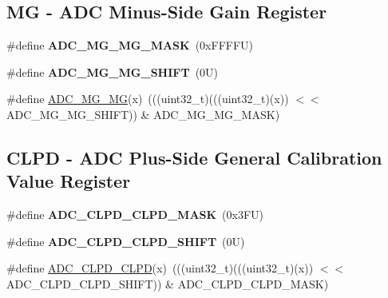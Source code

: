 \subsection*{MG -\/ A\+DC Minus-\/\+Side Gain Register}
\begin{DoxyCompactItemize}
\item 
\mbox{\label{group___a_d_c___register___masks_ga9f415258af1bad0159dd605efccd043b}} 
\#define {\bfseries A\+D\+C\+\_\+\+M\+G\+\_\+\+M\+G\+\_\+\+M\+A\+SK}~(0x\+F\+F\+F\+F\+U)
\item 
\mbox{\label{group___a_d_c___register___masks_ga4b2717da089f0de5bd41ef91001b7cfe}} 
\#define {\bfseries A\+D\+C\+\_\+\+M\+G\+\_\+\+M\+G\+\_\+\+S\+H\+I\+FT}~(0\+U)
\item 
\#define \mbox{\hyperlink{group___a_d_c___register___masks_gaca09277ff124324eca091b84eb116176}{A\+D\+C\+\_\+\+M\+G\+\_\+\+MG}}(x)~(((uint32\+\_\+t)(((uint32\+\_\+t)(x)) $<$$<$ A\+D\+C\+\_\+\+M\+G\+\_\+\+M\+G\+\_\+\+S\+H\+I\+FT)) \& A\+D\+C\+\_\+\+M\+G\+\_\+\+M\+G\+\_\+\+M\+A\+SK)
\end{DoxyCompactItemize}
\subsection*{C\+L\+PD -\/ A\+DC Plus-\/\+Side General Calibration Value Register}
\begin{DoxyCompactItemize}
\item 
\mbox{\label{group___a_d_c___register___masks_gaae8d6090ede9d73497ae3e0b4fa2c6cd}} 
\#define {\bfseries A\+D\+C\+\_\+\+C\+L\+P\+D\+\_\+\+C\+L\+P\+D\+\_\+\+M\+A\+SK}~(0x3\+F\+U)
\item 
\mbox{\label{group___a_d_c___register___masks_ga14a354b0de262fc93f30472e99bbe9bc}} 
\#define {\bfseries A\+D\+C\+\_\+\+C\+L\+P\+D\+\_\+\+C\+L\+P\+D\+\_\+\+S\+H\+I\+FT}~(0\+U)
\item 
\#define \mbox{\hyperlink{group___a_d_c___register___masks_gad24bf778e8245118707b43a195a7ddf3}{A\+D\+C\+\_\+\+C\+L\+P\+D\+\_\+\+C\+L\+PD}}(x)~(((uint32\+\_\+t)(((uint32\+\_\+t)(x)) $<$$<$ A\+D\+C\+\_\+\+C\+L\+P\+D\+\_\+\+C\+L\+P\+D\+\_\+\+S\+H\+I\+FT)) \& A\+D\+C\+\_\+\+C\+L\+P\+D\+\_\+\+C\+L\+P\+D\+\_\+\+M\+A\+SK)
\end{DoxyCompactItemize}
